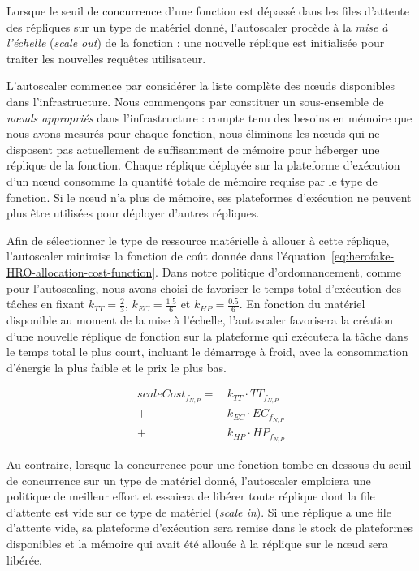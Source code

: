 Lorsque le seuil de concurrence d'une fonction est dépassé dans les files d'attente des répliques sur un type de matériel donné, l'autoscaler procède à la \textit{mise à l'échelle} (\textit{scale out}) de la fonction : une nouvelle réplique est initialisée pour traiter les nouvelles requêtes utilisateur.

L'autoscaler commence par considérer la liste complète des nœuds disponibles dans l'infrastructure. Nous commençons par constituer un sous-ensemble de \textit{nœuds appropriés} dans l'infrastructure : compte tenu des besoins en mémoire que nous avons mesurés pour chaque fonction, nous éliminons les nœuds qui ne disposent pas actuellement de suffisamment de mémoire pour héberger une réplique de la fonction. Chaque réplique déployée sur la plateforme d'exécution d'un nœud consomme la quantité totale de mémoire requise par le type de fonction. Si le nœud n'a plus de mémoire, ses plateformes d'exécution ne peuvent plus être utilisées pour déployer d'autres répliques.

Afin de sélectionner le type de ressource matérielle à allouer à cette réplique, l'autoscaler minimise la fonction de coût donnée dans l'équation~\ref{eq:herofake-HRO-allocation-cost-function}. Dans notre politique d'ordonnancement, comme pour l'autoscaling, nous avons choisi de favoriser le temps total d'exécution des tâches en fixant $k_{TT} = \frac{2}{3}$, $k_{EC} = \frac{1.5}{6}$ et $k_{HP} = \frac{0.5}{6}$.
En fonction du matériel disponible au moment de la mise à l'échelle, l'autoscaler favorisera la création d'une nouvelle réplique de fonction sur la plateforme qui exécutera la tâche dans le temps total le plus court, incluant le démarrage à froid, avec la consommation d'énergie la plus faible et le prix le plus bas.

\begin{equation}
\begin{split}
    scaleCost_{{f}_{N, P}} = \, &k_{TT} \cdot {TT}_{{f}_{N, P}} \\
    + &k_{EC} \cdot {EC}_{{f}_{N, P}} \\
    + &k_{HP} \cdot {HP}_{{f}_{N, P}}
\end{split}
\label{eq:herofake-HRO-allocation-cost-function}
\end{equation}

Au contraire, lorsque la concurrence pour une fonction tombe en dessous du seuil de concurrence sur un type de matériel donné, l'autoscaler emploiera une politique de meilleur effort et essaiera de libérer toute réplique dont la file d'attente est vide sur ce type de matériel (\textit{scale in}). Si une réplique a une file d'attente vide, sa plateforme d'exécution sera remise dans le stock de plateformes disponibles et la mémoire qui avait été allouée à la réplique sur le nœud sera libérée.

